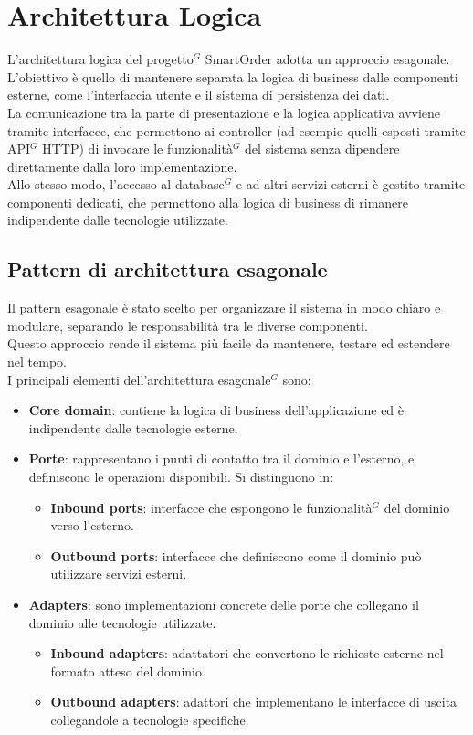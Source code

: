 \section{Architettura Logica}
L'architettura logica del progetto$^G$ SmartOrder adotta un approccio esagonale.\\
L'obiettivo è quello di mantenere separata la logica di business dalle componenti esterne, come l'interfaccia utente e il sistema di persistenza dei dati.\\
La comunicazione tra la parte di presentazione e la logica applicativa avviene tramite interfacce, che permettono ai controller (ad esempio quelli esposti tramite API$^G$ HTTP) di invocare le funzionalità$^G$ del sistema senza dipendere direttamente dalla loro implementazione.\\
Allo stesso modo, l'accesso al database$^G$ e ad altri servizi esterni è gestito tramite componenti dedicati, che permettono alla logica di business di rimanere indipendente dalle tecnologie utilizzate.

\subsection{Pattern di architettura esagonale}
Il pattern esagonale è stato scelto per organizzare il sistema in modo chiaro e modulare, separando le responsabilità tra le diverse componenti.\\
Questo approccio rende il sistema più facile da mantenere, testare ed estendere nel tempo.\\
I principali elementi dell'architettura esagonale$^G$ sono:\\
\begin{itemize}
	\item \textbf{Core domain}: contiene la logica di business dell'applicazione ed è indipendente dalle tecnologie esterne.
	\item \textbf{Porte}: rappresentano i punti di contatto tra il dominio e l'esterno, e definiscono le operazioni disponibili. Si distinguono in:
	\begin{itemize}
		\item \textbf{Inbound ports}: interfacce che espongono le funzionalità$^G$ del dominio verso l'esterno.
		\item \textbf{Outbound ports}: interfacce che definiscono come il dominio può utilizzare servizi esterni.
	\end{itemize}
	\item \textbf{Adapters}: sono implementazioni concrete delle porte che collegano il dominio alle tecnologie utilizzate.
	\begin{itemize}
		\item \textbf{Inbound adapters}: adattatori che convertono le richieste esterne nel formato atteso del dominio.
		\item \textbf{Outbound adapters}: adattori che implementano le interfacce di uscita collegandole a tecnologie specifiche.
	\end{itemize}
\end{itemize}